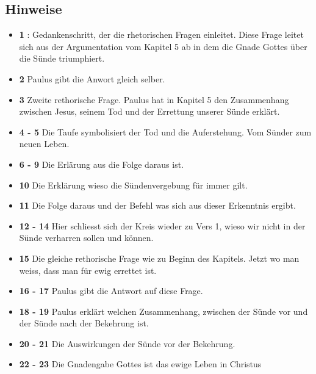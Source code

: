 \subsection{Hinweise}
\begin{itemize}
    \item \textbf{1} : Gedankenschritt, der die rhetorischen Fragen einleitet. Diese Frage leitet sich aus der Argumentation vom Kapitel 5 ab in dem die Gnade Gottes über die Sünde triumphiert.
    \item \textbf{2} Paulus gibt die Anwort gleich selber.
    \item \textbf{3} Zweite rethorische Frage. Paulus hat in Kapitel 5 den Zusammenhang zwischen Jesus, seinem Tod und der Errettung unserer Sünde erklärt.
    \item \textbf{4 - 5} Die Taufe symbolisiert der Tod und die Auferstehung. Vom Sünder zum neuen Leben.
    \item \textbf{6 - 9} Die Erlärung aus die Folge daraus ist. 
    \item \textbf{10} Die Erklärung wieso die Sündenvergebung für immer gilt.
    \item \textbf{11} Die Folge daraus und der Befehl was sich aus dieser Erkenntnis ergibt.
    \item \textbf{12 - 14} Hier schliesst sich der Kreis wieder zu Vers 1, wieso wir nicht in der Sünde verharren sollen und können.
    \item \textbf{15} Die gleiche rethorische Frage wie zu Beginn des Kapitels. Jetzt wo man weiss, dass man für ewig errettet ist.
    \item \textbf{16 - 17} Paulus gibt die Antwort auf diese Frage.
    \item \textbf{18 - 19} Paulus erklärt welchen Zusammenhang, zwischen der Sünde vor und der Sünde nach der Bekehrung ist.
    \item \textbf{20 - 21} Die Auswirkungen der Sünde vor der Bekehrung.
    \item \textbf{22 - 23} Die Gnadengabe Gottes ist das ewige Leben in Christus
\end{itemize}

